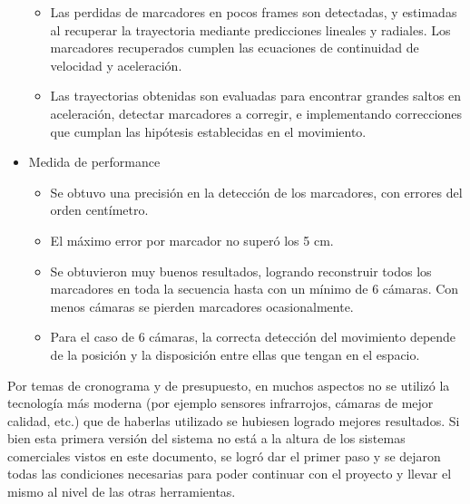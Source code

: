 \begin{itemize}
\begin{itemize}
	\item Las perdidas de marcadores en pocos frames son detectadas, y estimadas al recuperar la trayectoria mediante predicciones lineales y radiales. Los marcadores recuperados cumplen las ecuaciones de continuidad de velocidad y aceleración.
	
	\item Las trayectorias obtenidas son evaluadas para encontrar grandes saltos en aceleración, detectar marcadores a corregir, e implementando correcciones que cumplan las hipótesis establecidas en el movimiento.
	
	\end{itemize}		
	
	\item Medida de performance
	\begin{itemize}
		\item Se obtuvo una precisión en la detección de los marcadores, con errores del orden centímetro.
		\item El máximo error por marcador no superó los 5 cm.
		\item Se obtuvieron muy buenos resultados, logrando reconstruir todos los marcadores en toda la secuencia hasta con un mínimo de 6 cámaras. Con menos cámaras se pierden marcadores ocasionalmente.
		\item Para el caso de 6 cámaras, la correcta detección del movimiento depende de la posición y la disposición entre ellas que tengan en el espacio.
	\end{itemize}
\end{itemize}

Por temas de cronograma y de presupuesto, en muchos aspectos no se utilizó la tecnología más moderna (por ejemplo sensores infrarrojos, cámaras de mejor calidad, etc.) que de haberlas utilizado se hubiesen logrado mejores resultados. Si bien esta primera versión del sistema no está a la altura de los sistemas comerciales vistos en este documento, se logró dar el primer paso y se dejaron todas las condiciones necesarias para poder continuar con el proyecto y llevar el mismo al nivel de las otras herramientas.

